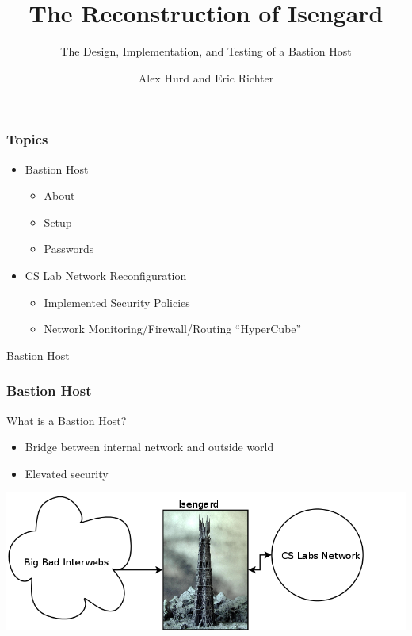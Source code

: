 \documentclass{beamer}
\title{The Reconstruction of Isengard}
\subtitle{The Design, Implementation, and Testing of a Bastion Host}
\author{Alex Hurd and Eric Richter}
\institute[COSI]{Clarkson Open Source Institute}
\begin{document}
\begin{frame}
  \titlepage
\end{frame}

\begin{frame}
  \frametitle{Topics}
  \begin{itemize}
    \item Bastion Host
    \begin{itemize}
      \item About
      \item Setup
      \item Passwords
    \end{itemize}
    \item CS Lab Network Reconfiguration
    \begin{itemize}
      \item Implemented Security Policies
      \item Network Monitoring/Firewall/Routing ``HyperCube''
    \end{itemize}
  \end{itemize}
\end{frame}

\begin{frame}
  \centerline{\huge{Bastion Host}}
  
\end{frame}

\begin{frame}
  \frametitle{Bastion Host}
What is a Bastion Host?
  \begin{itemize}
    \item Bridge between internal network and outside world
    \item Elevated security
  \end{itemize}
  \includegraphics[width=\textwidth]{diagrams/isengard.png}
\end{frame}
\end{document}
